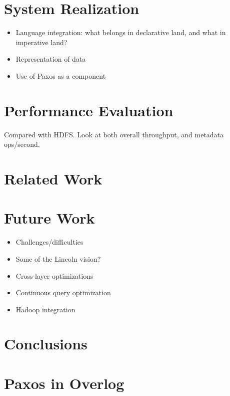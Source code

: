 \documentclass{article}
\begin{document}
\section{System Realization}
\begin{itemize}
\item
  Language integration: what belongs in declarative land, and what in
  imperative land?

\item
  Representation of data

\item
  Use of Paxos as a component
\end{itemize}

\section{Performance Evaluation}
Compared with HDFS. Look at both overall throughput, and metadata ops/second.

\section{Related Work}

\section{Future Work}
\begin{itemize}
\item
  Challenges/difficulties

\item
  Some of the Lincoln vision?

\item
  Cross-layer optimizations

\item
  Continuous query optimization

\item
  Hadoop integration
\end{itemize}

\section{Conclusions}



\appendix
\section{Paxos in Overlog}
\end{document}
